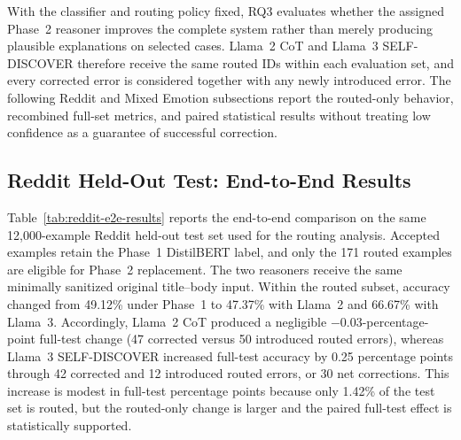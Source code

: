 \documentclass{ieeeaccess}
\begin{document}
With the classifier and routing policy fixed, RQ3 evaluates whether the assigned Phase~2 reasoner improves the complete system rather than merely producing plausible explanations on selected cases. Llama~2 CoT and Llama~3 SELF-DISCOVER therefore receive the same routed IDs within each evaluation set, and every corrected error is considered together with any newly introduced error. The following Reddit and Mixed Emotion subsections report the routed-only behavior, recombined full-set metrics, and paired statistical results without treating low confidence as a guarantee of successful correction.

\subsection{Reddit Held-Out Test: End-to-End Results}

Table~\ref{tab:reddit-e2e-results} reports the end-to-end comparison on the same 12,000-example Reddit held-out test set used for the routing analysis. Accepted examples retain the Phase~1 DistilBERT label, and only the 171 routed examples are eligible for Phase~2 replacement. The two reasoners receive the same minimally sanitized original title--body input. Within the routed subset, accuracy changed from 49.12\% under Phase~1 to 47.37\% with Llama~2 and 66.67\% with Llama~3. Accordingly, Llama~2 CoT produced a negligible $-0.03$-percentage-point full-test change (47 corrected versus 50 introduced routed errors), whereas Llama~3 SELF-DISCOVER increased full-test accuracy by 0.25 percentage points through 42 corrected and 12 introduced routed errors, or 30 net corrections. This increase is modest in full-test percentage points because only 1.42\% of the test set is routed, but the routed-only change is larger and the paired full-test effect is statistically supported.
\end{document}
